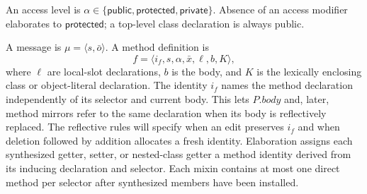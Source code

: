 \documentclass[11pt]{article}
\numberwithin{equation}{section}
\newcommand{\kw}[1]{\ensuremath{\mathsf{#1}}}
\newcommand{\Public}{\kw{public}}
\newcommand{\Protected}{\kw{protected}}
\newcommand{\Private}{\kw{private}}
\begin{document}
An access level is $\alpha\in\{\Public,\Protected,\Private\}$.  Absence of an
access modifier elaborates to $\Protected$; a top-level class declaration is
always public.

A message is $\mu=\langle s,\bar o\rangle$.  A method definition is
\begin{equation}\label{eq:method-definition}
 f=\langle i_f,s,\alpha,\bar x,\ell,b,K\rangle,
\end{equation}
where $\ell$ are local-slot declarations, $b$ is the body, and $K$ is the
lexically enclosing class or object-literal declaration.  The identity $i_f$ names the method
declaration independently of its selector and current body.  This lets
$P.\mathit{body}$ and, later, method mirrors refer to the same declaration when
its body is reflectively replaced.  The reflective rules will specify when an
edit preserves $i_f$ and when deletion followed by addition allocates a fresh
identity.  Elaboration assigns each synthesized getter, setter, or nested-class
getter a method identity derived from its inducing declaration and selector.
Each mixin contains at most one direct method per selector after synthesized
members have been installed.
\end{document}
